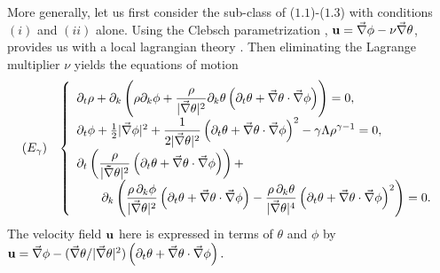 \documentclass[11pt,a4paper]{article}
\begin{document}
More generally, let us first consider
the sub-class of ($1.1$)-($1.3$) with
conditions $(i)$ and $(ii)$ alone. Using the
Clebsch parametrization \cite{CLE},
${\bf u}=\vec{\nabla}\phi-\nu\vec{\nabla}\theta$,
provides us with a local lagrangian theory \cite{RS}.
Then eliminating the Lagrange multiplier $\nu$
yields the equations of motion
\begin{eqnarray}
\begin{array}{ll}
\left(E_{\gamma}\right) &
\left\lbrace
\begin{array}{l}
\partial_t\rho+\partial_k\left(\rho\partial_k\phi+
\displaystyle{\frac{\rho}
{\vert\vec{\nabla}\theta\vert^2}}\partial_k
\theta\left(\partial_t\theta+
{\vec\nabla}
\theta\cdot\vec{\nabla}\phi\right)\right)=0,
\\[3mm]
\partial_t\phi+\frac{1}{2}
\vert{\vec\nabla}\phi\vert^2+
\displaystyle{\frac{1}
{2\vert{\vec\nabla}\theta\vert^2}}
\left(\partial_t\theta+
\vec{\nabla}\theta\cdot{\vec\nabla}\phi\right)^2
-\gamma\Lambda\rho^{\gamma-1}=0,
\\[3mm]
\partial_t\left(\displaystyle{\frac{\rho}{\vert{\bf
\vec\nabla}\theta\vert^2}}\left(\partial_t\theta
+\vec{\nabla}\theta\cdot{\vec\nabla}\phi\right)\right)+
\\[2mm]
\qquad
\partial_k\left(\displaystyle{\frac{\rho\,\partial_k\phi}
{\vert{{\vec{\nabla}}}\theta\vert^2}}\left(\partial_t\theta
+\vec{\nabla}\theta\cdot{{\vec{\nabla}}}\phi\right)
-\displaystyle{\frac{\rho\,\partial_k\theta}
{\vert{{\vec{\nabla}}}\theta\vert^{4}}}
\left(\partial_t\theta
+\vec{\nabla}
\theta\cdot{{\vec{\nabla}}}\phi\right)^2\right)=0.
\label{equationsQ}
\end{array}
\right.
\end{array}
\end{eqnarray}
The velocity field
${\bf u}$ here is expressed in terms of $\theta$ and $\phi$ by
${\bf u}=\vec{\nabla}\phi-
(\vec{\nabla}\theta/\vert{\vec{\nabla}}\theta\vert^2)
\left(\partial_t\theta
+\vec{\nabla}\theta\cdot{\vec\nabla}\phi\right).
$
\end{document}
